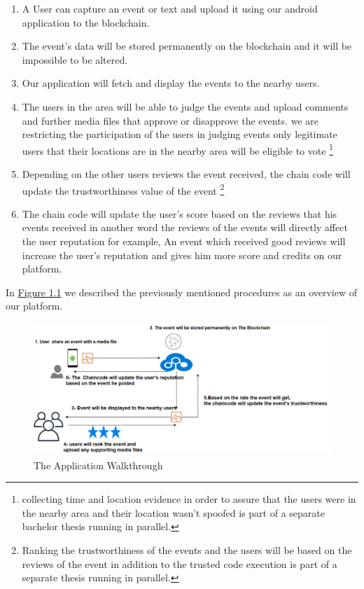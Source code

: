        \begin{enumerate}
	 \item {A User can capture an event or text and upload it using our android application to the blockchain.}
	 \item {The event's data will be stored permanently on the blockchain and it will be impossible to be altered.} 
	 \item {Our application will fetch and display the events to the nearby users.} 
         \item {The users in the area will be able to judge the events and upload comments and further media files that approve or disapprove the events.  we are restricting the participation of the users in judging events only legitimate users that their locations are in the nearby area will be eligible to vote \footnote[1]{collecting time and location evidence in order to assure that the users were in the nearby area and their location wasn't spoofed  is part of a separate bachelor thesis running in parallel.} }
         \item {Depending on the other users reviews the event received, the chain code will update the trustworthiness value of the event \footnote[2]{Ranking the trustworthiness of the events and the users will be based on the reviews of the event in addition to the trusted code execution is part of a separate thesis running in parallel. } }
          \item {The chain code will update the user's score based on the reviews that his events received in another word the reviews of the events will directly affect the user reputation for example, An event which received good reviews will increase the user's reputation and gives him more score and credits on our platform.} 
	\end{enumerate}
	In \hyperref[fig:appflow]{Figure 1.1} we described the previously mentioned procedures as an overview of our platform.
	\begin{figure}[H]
	\includegraphics[width=15cm,height=5cm]{images/appflow.png}
	\caption{The Application Walkthrough}
	\label{fig:appflow}
	\end{figure}

